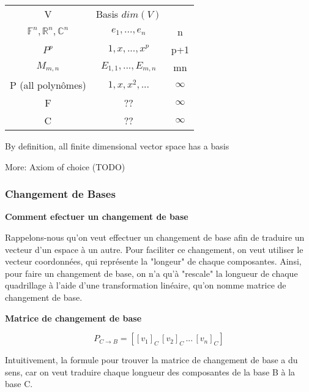 \documentclass{article}
\begin{document}
\begin{proposition}
    \begin{tabular}{c c c}
	V & Basis $ dim(V)$ \\
	$\mathbb{F}^n, \mathbb{R}^n, \mathbb{C}^n$ & ${e_1, ..., e_n}$
	& n \\
	$ P^p $ & ${1,x,..., x^p} $ & p+1 \\
	$ M_{m,n}$ & $ {E_{1,1}, ..., E_{m,n}} $ & mn \\
	P (all polynômes) & $ {1,x,x^2,...}$ & $ \infty $\\
	F & ?? & $ \infty $\\
	C & ?? & $ \infty $\\
    \end{tabular}
\end{proposition}

\begin{remark}
    By definition, all finite dimensional vector space has a basis
\end{remark}

More: Axiom of choice (TODO)

\subsubsection{Changement de Bases}%
\label{ssub:Changement de Bases}

\textbf{Comment efectuer un changement de base}

Rappelons-nous qu'on veut effectuer un changement de base afin de
traduire un vecteur d'un espace à un autre. Pour faciliter ce changement,
on veut utiliser le vecteur coordonnées, qui représente la "longeur"
de chaque composantes. Ainsi, pour faire un changement de base, on n'a
qu'à "rescale" la longueur de chaque quadrillage à l'aide d'une
transformation linéaire, qu'on nomme matrice de changement de base.

\textbf{Matrice de changement de base}

\begin{definition}
    $$ P_{C \rightarrow B} = [ [v_1]_C \, [v_2]_C \, ... \, [v_n]_C ] $$
\end{definition}

\begin{remark}
    Intuitivement, la formule pour trouver la matrice de changement de
    base a du sens, car on veut traduire chaque longueur des composantes
    de la base B à la base C.
\end{remark}
\end{document}
